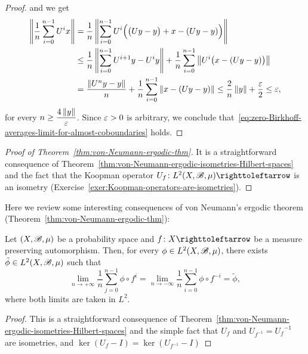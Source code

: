 \begin{proof}
  and we get
  \begin{displaymath}
    \begin{split}
      \left\|{\frac{1}{n}\sum_{i=0}^{n-1} U^{i}x}\right\| & = \frac{1}{n} \left\|{\sum_{i=0}^{n-1} U^{i}\Big(\big(Uy-y\big) + x - (Uy-y)\Big)}\right\| \\
                                                &\leq \frac{1}{n} \left\|{\sum_{i=0}^{n-1} U^{i+1}y-U^{i}y}\right\| + \frac{1}{n} \sum_{i=0}^{n-1} \left\|{U^{i}\big(x - (Uy-y)\big)}\right\| \\
                                                &= \frac{\left\|{U^{n}y-y}\right\|}{n} +  \frac{1}{n} \sum_{i=0}^{n-1} \left\|{x - (Uy-y)}\right\| \leq \frac{2}{n}\left\|{y}\right\| + \frac{\varepsilon}{2}\leq \varepsilon,
    \end{split}
  \end{displaymath}
  for every $n\geq \dfrac{4\left\|{y}\right\|}{\varepsilon}$. Since $\varepsilon>0$ is arbitrary, we conclude that~\eqref{eq:zero-Birkhoff-averages-limit-for-almost-coboundaries} holds.
\end{proof}

\begin{proof}[Proof of Theorem~\ref{thm:von-Neumann-ergodic-thm}]
  It is a straightforward consequence of Theorem~\ref{thm:von-Neumann-ergodic-isometries-Hilbert-spaces} and the fact that the Koopman operator $U_{f}\colon L^{2}(X,\B,\mu)\carr$ is an isometry (Exercise~\ref{exer:Koopman-operators-are-isometries}).
\end{proof}

Here we review some interesting consequences of von Neumann's ergodic theorem (Theorem~\ref{thm:von-Neumann-ergodic-thm}):

\begin{corollary}\label{cor:von-Neumann-for-automorphisms-back-eq-for}
  Let $(X,\mathscr{B},\mu)$ be a probability space and $f\colon X\carr$ be a measure preserving automorphism. Then, for every $\phi\in L^{2}(X,\mathscr{B},\mu)$, there exists $\tilde\phi\in L^{2}(X,\mathscr{B},\mu)$ such that
  \begin{displaymath}
    \lim_{n\to+\infty}\frac{1}{n}\sum_{j=0}^{n-1}\phi\circ f^{i} = \lim_{n\to-\infty}\frac{1}{n}\sum_{i=0}^{n-1}\phi\circ f^{-i} =\tilde\phi,
  \end{displaymath}
  where both limits are taken in $L^{2}$.
\end{corollary}

\begin{proof}
  This is a straightforward consequence of Theorem~\ref{thm:von-Neumann-ergodic-isometries-Hilbert-spaces} and the simple fact that $U_{f}$ and $U_{f^{-1}}={U_{f}}^{-1}$ are isometries, and $\ker(U_{f}-I)=\ker(U_{f^{-1}}-I)$
\end{proof}

